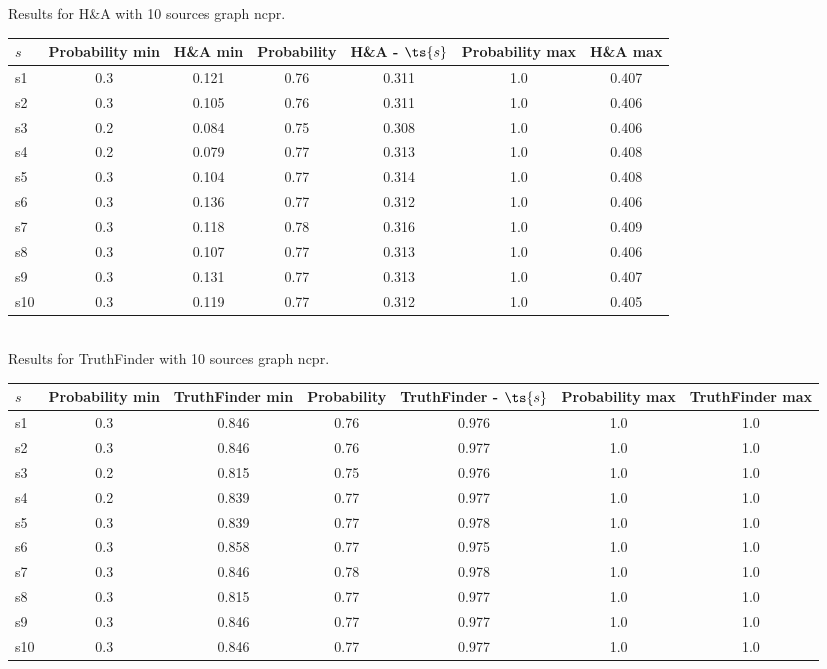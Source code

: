 \documentclass{article}
\begin{document}
\noindent Results for H\&A with 10 sources graph ncpr.

\noindent\begin{tabular}{|l|c|c|c|c|c|c|}
\hline
$s$& Probability min & H\&A min & Probability & H\&A - $\ts{s}$ & Probability max & H\&A max\\
\hline
s1 &0.3 & 0.121 & 0.76 & 0.311 & 1.0 & 0.407\\
\hline
s2 &0.3 & 0.105 & 0.76 & 0.311 & 1.0 & 0.406\\
\hline
s3 &0.2 & 0.084 & 0.75 & 0.308 & 1.0 & 0.406\\
\hline
s4 &0.2 & 0.079 & 0.77 & 0.313 & 1.0 & 0.408\\
\hline
s5 &0.3 & 0.104 & 0.77 & 0.314 & 1.0 & 0.408\\
\hline
s6 &0.3 & 0.136 & 0.77 & 0.312 & 1.0 & 0.406\\
\hline
s7 &0.3 & 0.118 & 0.78 & 0.316 & 1.0 & 0.409\\
\hline
s8 &0.3 & 0.107 & 0.77 & 0.313 & 1.0 & 0.406\\
\hline
s9 &0.3 & 0.131 & 0.77 & 0.313 & 1.0 & 0.407\\
\hline
s10 &0.3 & 0.119 & 0.77 & 0.312 & 1.0 & 0.405\\
\hline
\end{tabular}\\

\noindent Results for TruthFinder with 10 sources graph ncpr.

\noindent\begin{tabular}{|l|c|c|c|c|c|c|}
\hline
$s$& Probability min & TruthFinder min & Probability & TruthFinder - $\ts{s}$ & Probability max & TruthFinder max\\
\hline
s1 &0.3 & 0.846 & 0.76 & 0.976 & 1.0 & 1.0\\
\hline
s2 &0.3 & 0.846 & 0.76 & 0.977 & 1.0 & 1.0\\
\hline
s3 &0.2 & 0.815 & 0.75 & 0.976 & 1.0 & 1.0\\
\hline
s4 &0.2 & 0.839 & 0.77 & 0.977 & 1.0 & 1.0\\
\hline
s5 &0.3 & 0.839 & 0.77 & 0.978 & 1.0 & 1.0\\
\hline
s6 &0.3 & 0.858 & 0.77 & 0.975 & 1.0 & 1.0\\
\hline
s7 &0.3 & 0.846 & 0.78 & 0.978 & 1.0 & 1.0\\
\hline
s8 &0.3 & 0.815 & 0.77 & 0.977 & 1.0 & 1.0\\
\hline
s9 &0.3 & 0.846 & 0.77 & 0.977 & 1.0 & 1.0\\
\hline
s10 &0.3 & 0.846 & 0.77 & 0.977 & 1.0 & 1.0\\
\hline
\end{tabular}\\
\end{document}
